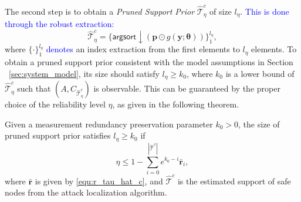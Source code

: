 \noindent The second step is to obtain a \emph{Pruned Support Prior} $\hat{\mathcal{T}}^{c}_{\eta}$ of size $l_{\eta}$\textcolor{blue}{. This is done through the robust extraction:}
\begin{equation}    \label{equ:pruning_alg}
    \hat{\mathcal{T}}^{c}_{\eta} =  \big\{\textsf{argsort} \downarrow (\mathbf{p} \odot g(\mathbf{y};\boldsymbol{\theta}))\big\}_{1}^{l_{\eta}},
\end{equation}
where $\{\cdot\}_{1}^{l_{\eta}}$ \textcolor{blue}{denotes} an index extraction from the first elements to $l_{\eta}$ elements. To obtain a pruned support prior consistent with the model assumptions in Section ~\ref{sec:system_model}, its size should satisfy $l_{\eta}\geq k_0$, where $k_0$ is a lower bound of $\hat{\mathcal{T}}^{c}_{\eta}$ such that $(A,C_{\hat{\mathcal{T}}^{c}_{\eta}})$ is observable. This can be guaranteed by the proper choice of the reliability level $\eta$, as given in the following theorem.
\begin{theorem}\label{Thm:eta_upper_bound}
Given a measurement redundancy preservation parameter $k_0>0$, the size of pruned support prior satisfies $l_{\eta}\geq k_0$ if
\begin{equation}\label{equ:eta_upper_bound}
\eta \leq  1- \sum_{i=0}^{|\hat{\mathcal{T}}^c|} e^{k_0-i} \bar{\mathbf{r}}_i,
\end{equation}
where $\bar{\mathbf{r}}$ is given by \eqref{equ:r_tau_hat_c}, and $\hat{\mathcal{T}}^c$ is the estimated support of safe nodes from the attack localization algorithm.
\end{theorem}
